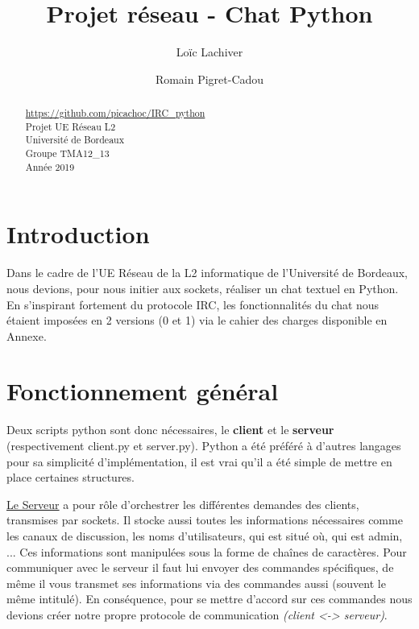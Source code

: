 \documentclass[12pt]{article}
\title{Projet réseau - Chat Python}
\author{Loïc Lachiver}
\author{Romain Pigret-Cadou}
\begin{document}
\maketitle


\begin{abstract}
    \begin{center}
    \url{https://github.com/picachoc/IRC_python}
    \\Projet UE Réseau L2
    \\Université de Bordeaux
    \\Groupe TMA12\_13
    \\Année 2019
    \end{center}
\end{abstract}


\tableofcontents



\section{Introduction}
Dans le cadre de l'UE Réseau de la L2 informatique de l'Université de Bordeaux,
nous devions, pour nous initier aux sockets, réaliser un chat textuel en Python.
En s'inspirant fortement du protocole IRC, les fonctionnalités du chat nous étaient
imposées en 2 versions (0 et 1) via le cahier des charges disponible en Annexe.

\section{Fonctionnement général}

Deux scripts python sont donc nécessaires, le \textbf{client} et
le \textbf{serveur} (respectivement
client.py et server.py). Python a été préféré à d'autres langages pour sa simplicité
d'implémentation, il est vrai qu'il a été simple de mettre en place
certaines structures.

\underline{Le Serveur} a pour rôle d'orchestrer les différentes demandes des clients,
transmises par sockets. Il stocke aussi toutes les informations nécessaires comme
les canaux de discussion, les noms d'utilisateurs, qui est situé où, qui est admin, ...
Ces informations sont manipulées sous la forme de chaînes de caractères.
Pour communiquer avec le serveur il faut lui envoyer des commandes spécifiques,
de même il vous transmet ses informations via des commandes aussi (souvent le même intitulé).
En conséquence, pour se mettre d'accord sur ces commandes nous devions créer notre propre
protocole de communication \emph{(client <-> serveur)}.
\end{document}
